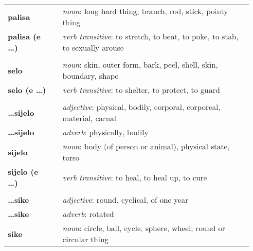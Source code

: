 \begin{supertabular}{p{2,5cm}|ll}
    \textbf{palisa}           &  & \textit{noun}: long hard thing; branch, rod, stick, pointy thing                            \\ %
    \textbf{palisa (e \dots)} &  & \textit{verb transitive}: to stretch, to beat, to poke, to stab, to sexually arouse         \\ %
                              &  &                                                                                             \\ %
    \textbf{selo}             &  & \textit{noun}: skin, outer form, bark, peel, shell, skin, boundary, shape                   \\ %
    \textbf{selo (e \dots)}   &  & \textit{verb transitive}: to shelter, to protect, to guard                                  \\ %
                              &  &                                                                                             \\ %
    \textbf{\dots sijelo}     &  & \textit{adjective}: physical, bodily, corporal, corporeal, material, carnal                 \\ %
    \textbf{\dots sijelo}     &  & \textit{adverb}: physically, bodily                                                         \\ %
    \textbf{sijelo}           &  & \textit{noun}: body (of person or animal), physical state, torso                            \\ %
    \textbf{sijelo (e \dots)} &  & \textit{verb transitive}: to heal, to heal up, to cure                                      \\ %
                              &  &                                                                                             \\ %
    \textbf{\dots sike}       &  & \textit{adjective}: round, cyclical, of one year                                            \\ %
    \textbf{\dots sike}       &  & \textit{adverb}: rotated                                                                    \\ %
    \textbf{sike}             &  & \textit{noun}: circle, ball, cycle, sphere, wheel; round or circular thing                  \\ %

\end{supertabular}
